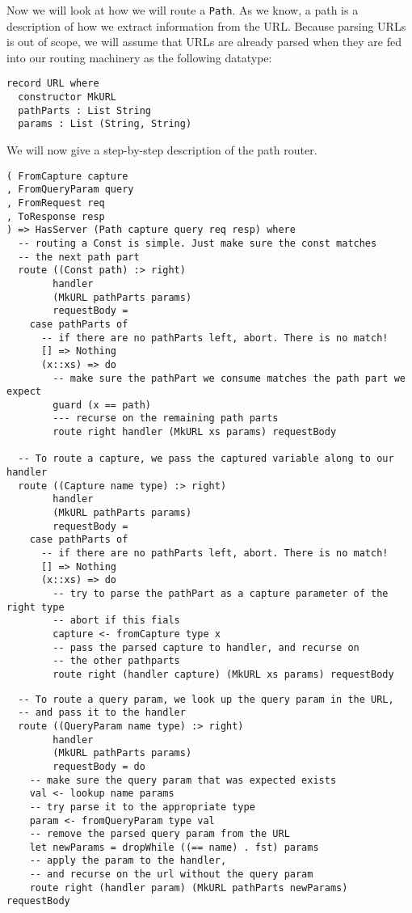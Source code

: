 \documentclass[12pt,a4paper]{article}
\begin{document}
Now we will look at how we will route a \texttt{Path}. As we know, a path 
is a description of how we extract information from the URL. Because parsing URLs
is out of scope, we will assume that URLs are already parsed when they are fed into our
routing machinery as the following datatype:
\begin{verbatim}
record URL where
  constructor MkURL
  pathParts : List String
  params : List (String, String)
\end{verbatim}

\clearpage
We will now give a step-by-step description of the path router.
\begin{verbatim}
( FromCapture capture
, FromQueryParam query
, FromRequest req
, ToResponse resp
) => HasServer (Path capture query req resp) where
  -- routing a Const is simple. Just make sure the const matches
  -- the next path part
  route ((Const path) :> right)
        handler
        (MkURL pathParts params) 
        requestBody =
    case pathParts of
      -- if there are no pathParts left, abort. There is no match!
      [] => Nothing
      (x::xs) => do
        -- make sure the pathPart we consume matches the path part we expect
        guard (x == path)
        --- recurse on the remaining path parts
        route right handler (MkURL xs params) requestBody

  -- To route a capture, we pass the captured variable along to our handler
  route ((Capture name type) :> right)
        handler
        (MkURL pathParts params)
        requestBody =
    case pathParts of
      -- if there are no pathParts left, abort. There is no match!
      [] => Nothing
      (x::xs) => do
        -- try to parse the pathPart as a capture parameter of the right type
        -- abort if this fials
        capture <- fromCapture type x
        -- pass the parsed capture to handler, and recurse on
        -- the other pathparts
        route right (handler capture) (MkURL xs params) requestBody
\end{verbatim}
\pagebreak
\begin{verbatim}
  -- To route a query param, we look up the query param in the URL,
  -- and pass it to the handler
  route ((QueryParam name type) :> right)
        handler
        (MkURL pathParts params)
        requestBody = do
    -- make sure the query param that was expected exists
    val <- lookup name params
    -- try parse it to the appropriate type
    param <- fromQueryParam type val
    -- remove the parsed query param from the URL
    let newParams = dropWhile ((== name) . fst) params
    -- apply the param to the handler,
    -- and recurse on the url without the query param
    route right (handler param) (MkURL pathParts newParams) requestBody
\end{verbatim}
\end{document}
